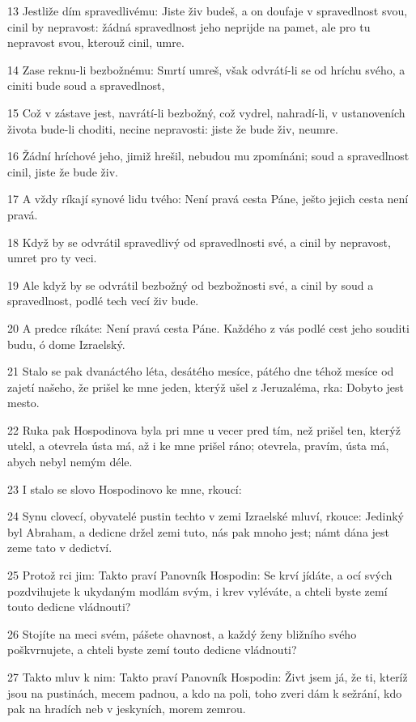 \par 13 Jestliže dím spravedlivému: Jiste živ budeš, a on doufaje v spravedlnost svou, cinil by nepravost: žádná spravedlnost jeho neprijde na pamet, ale pro tu nepravost svou, kterouž cinil, umre.
\par 14 Zase reknu-li bezbožnému: Smrtí umreš, však odvrátí-li se od hríchu svého, a ciniti bude soud a spravedlnost,
\par 15 Což v zástave jest, navrátí-li bezbožný, což vydrel, nahradí-li, v ustanoveních života bude-li choditi, necine nepravosti: jiste že bude živ, neumre.
\par 16 Žádní hríchové jeho, jimiž hrešil, nebudou mu zpomínáni; soud a spravedlnost cinil, jiste že bude živ.
\par 17 A vždy ríkají synové lidu tvého: Není pravá cesta Páne, ješto jejich cesta není pravá.
\par 18 Když by se odvrátil spravedlivý od spravedlnosti své, a cinil by nepravost, umret pro ty veci.
\par 19 Ale když by se odvrátil bezbožný od bezbožnosti své, a cinil by soud a spravedlnost, podlé tech vecí živ bude.
\par 20 A predce ríkáte: Není pravá cesta Páne. Každého z vás podlé cest jeho souditi budu, ó dome Izraelský.
\par 21 Stalo se pak dvanáctého léta, desátého mesíce, pátého dne téhož mesíce od zajetí našeho, že prišel ke mne jeden, kterýž ušel z Jeruzaléma, rka: Dobyto jest mesto.
\par 22 Ruka pak Hospodinova byla pri mne u vecer pred tím, než prišel ten, kterýž utekl, a otevrela ústa má, až i ke mne prišel ráno; otevrela, pravím, ústa má, abych nebyl nemým déle.
\par 23 I stalo se slovo Hospodinovo ke mne, rkoucí:
\par 24 Synu clovecí, obyvatelé pustin techto v zemi Izraelské mluví, rkouce: Jedinký byl Abraham, a dedicne držel zemi tuto, nás pak mnoho jest; námt dána jest zeme tato v dedictví.
\par 25 Protož rci jim: Takto praví Panovník Hospodin: Se krví jídáte, a ocí svých pozdvihujete k ukydaným modlám svým, i krev vyléváte, a chteli byste zemí touto dedicne vládnouti?
\par 26 Stojíte na meci svém, pášete ohavnost, a každý ženy bližního svého poškvrnujete, a chteli byste zemí touto dedicne vládnouti?
\par 27 Takto mluv k nim: Takto praví Panovník Hospodin: Živt jsem já, že ti, kteríž jsou na pustinách, mecem padnou, a kdo na poli, toho zveri dám k sežrání, kdo pak na hradích neb v jeskyních, morem zemrou.
